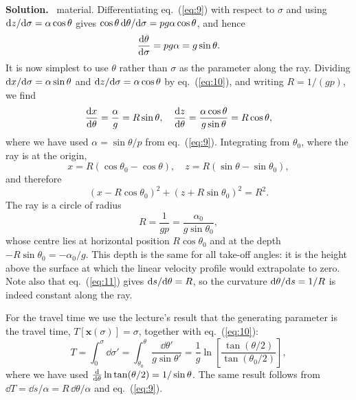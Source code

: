 \documentclass[a4paper,12pt]{paper}
\newenvironment{solution}{\par\noindent\textbf{Solution.}\ }{\par\medskip}
\begin{document}
\begin{solution}
material. Differentiating eq.~(\ref{eq:9}) with respect to $\sigma$ and using
$\mathrm{d} z/\mathrm{d}\sigma=\alpha\cos\theta$ gives
$\cos\theta\,\mathrm{d}\theta/\mathrm{d}\sigma=pg\alpha\cos\theta$, and hence
\begin{equation}
\frac{\mathrm{d}\theta}{\mathrm{d}\sigma}=pg\alpha=g\sin\theta.
\label{eq:10}
\end{equation}
It is now simplest to use $\theta$ rather than $\sigma$ as the parameter along the ray. Dividing
$\mathrm{d} x/\mathrm{d}\sigma=\alpha\sin\theta$ and $\mathrm{d} z/\mathrm{d}\sigma=\alpha\cos\theta$ by
eq.~(\ref{eq:10}), and writing $R=1/(gp)$, we find
\begin{equation}
\frac{\mathrm{d} x}{\mathrm{d}\theta}=\frac{\alpha}{g}=R\sin\theta,\quad
\frac{\mathrm{d} z}{\mathrm{d}\theta}=\frac{\alpha\cos\theta}{g\sin\theta}=R\cos\theta,
\label{eq:11}
\end{equation}
where we have used $\alpha=\sin\theta/p$ from eq.~(\ref{eq:9}). Integrating from
$\theta_{0}$, where the ray is at the origin,
\begin{equation}
x=R(\cos\theta_{0}-\cos\theta),\quad z=R(\sin\theta-\sin\theta_{0}),
\label{eq:12}
\end{equation}
and therefore
\begin{equation}
(x-R\cos\theta_{0})^{2}+(z+R\sin\theta_{0})^{2}=R^{2}.
\label{eq:13}
\end{equation}
The ray is a circle of radius
\begin{equation}
R=\frac{1}{gp}=\frac{\alpha_{0}}{g\sin\theta_{0}},
\label{eq:14}
\end{equation}
whose centre lies at horizontal position $R\cos\theta_{0}$ and at the depth
$-R\sin\theta_{0}=-\alpha_{0}/g$. This depth is the same for all take-off angles: it is the
height above the surface at which the linear velocity profile would extrapolate to zero. Note also
that eq.~(\ref{eq:11}) gives $\mathrm{d} s/\mathrm{d}\theta=R$, so the curvature $\mathrm{d}\theta/\mathrm{d} s=1/R$
is indeed constant along the ray.

For the travel time we use the lecture's result that the generating parameter is the travel time,
$T[\mathbf{x}(\sigma)]=\sigma$, together with eq.~(\ref{eq:10}):
\begin{equation}
T=\int_{0}^{\sigma}\dd\sigma'=\int_{\theta_{0}}^{\theta}\frac{\dd\theta'}{g\sin\theta'}
=\frac{1}{g}\ln\left[\frac{\tan(\theta/2)}{\tan(\theta_{0}/2)}\right],
\label{eq:15}
\end{equation}
where we have used $\frac{\mathrm{d}}{\mathrm{d}\theta}\ln\tan(\theta/2)=1/\sin\theta$. The same result follows
from $\dd T=\dd s/\alpha=R\,\dd\theta/\alpha$ and eq.~(\ref{eq:9}).


\end{solution}
\end{document}
